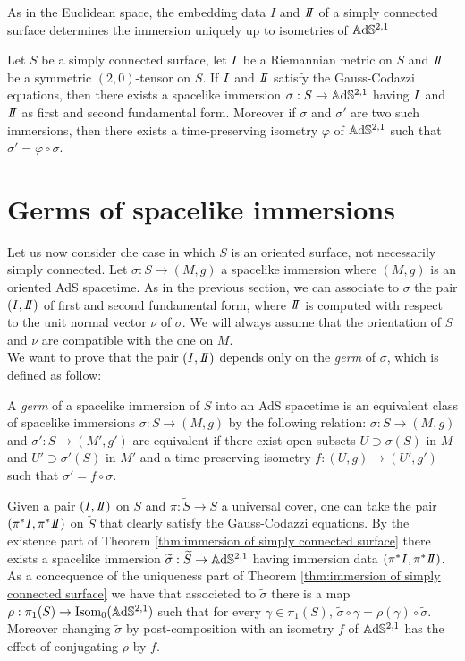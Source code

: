 As in the Euclidean space, the embedding data $I$ and $\II$ of a simply connected surface determines the immersion uniquely up to isometries of $\mathbb{A}\mathrm{d}\mathbb{S}^{2,1}$
\begin{theorem}\label{thm:immersion of simply connected surface}
    Let $S$ be a simply connected surface, let $I$ be a Riemannian metric on $S$ and $\II$ be a symmetric $(2,0)$-tensor on $S$. If $I$ and $\II$ satisfy the Gauss-Codazzi equations, then there exists a spacelike immersion $\sigma:S \to\mathbb{A}\mathrm{d}\mathbb{S}^{2,1}$ having $I$ and $\II$ as first and second fundamental form. Moreover if $\sigma$ and $\sigma'$ are two such immersions, then there exists a time-preserving isometry $\varphi$ of $\mathbb{A}\mathrm{d}\mathbb{S}^{2,1}$ such that $\sigma' = \varphi \circ \sigma$.
\end{theorem}

\section{Germs of spacelike immersions}
Let us now consider che case in which $S$ is an oriented surface, not necessarily simply connected. Let $\sigma: S \to(M,g)$ a spacelike immersion where $(M,g)$ is an oriented AdS spacetime.
As in the previous section, we can associate to $\sigma$ the pair $(\I,\II)$ of first and second  fundamental form, where $\II$ is  computed with respect to the unit normal vector $\nu$ of $\sigma$.
We will always assume that the orientation of $S$ and $\nu$ are compatible with the one on $M$.\\
We want to prove that the pair $(\I,\II)$ depends only on the \textit{germ} of $\sigma$, which is defined as follow:
\begin{definition}
    A \textit{germ} of a spacelike immersion of $S$ into an AdS spacetime is an equivalent class of spacelike immersions $\sigma:S \to(M,g)$ by the following relation: $\sigma:S \to(M,g)$ and $\sigma':S \to(M',g')$ are equivalent if there exist open subsets $U \supset \sigma(S)$ in $M$ and $U' \supset \sigma'(S)$ in $M'$ and a time-preserving isometry $f:(U,g)\to(U',g')$ such that $\sigma' = f \circ \sigma$.
\end{definition}
Given a pair $(\I,\II)$ on $S$ and $\pi: \widetilde{S}\to S$ a universal cover, one can take the pair $(\pi^*\I, \pi^*\II)$ on $\widetilde{S}$ that clearly satisfy the Gauss-Codazzi equations. By the existence part of Theorem \ref{thm:immersion of simply connected surface} there exists a spacelike immersion $\widetilde{\sigma}: \widetilde{S} \to\mathbb{A}\mathrm{d}\mathbb{S}^{2,1}$ having immersion data $(\pi^*\I, \pi^*\II)$. As a concequence of the uniqueness part of Theorem \ref{thm:immersion of simply connected surface} we have that associeted to $\widetilde{\sigma}$ there is a map $\rho:\pi_1(S) \to \text{Isom}_0(\mathbb{A}\mathrm{d}\mathbb{S}^{2,1})$ such that for every $\gamma \in \pi_1(S)$, $\widetilde{\sigma} \circ \gamma = \rho(\gamma) \circ \widetilde{\sigma}$. Moreover changing $\widetilde{\sigma}$ by post-composition with an isometry $f$ of $\mathbb{A}\mathrm{d}\mathbb{S}^{2,1}$ has the effect of conjugating $\rho$ by $f$.\\
